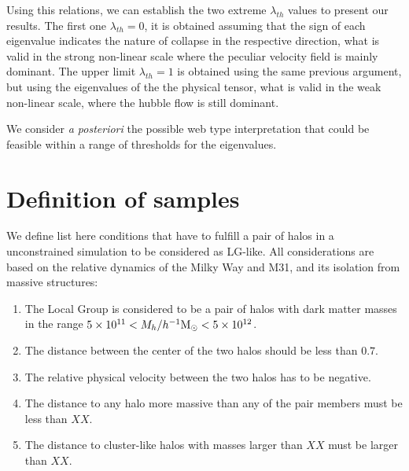 \documentclass[usenatbib]{mn2e}
\begin{document}
Using this relations, we can establish the two extreme $\lambda_{th}$ 
values to present our results. The first one $\lambda_{th} = 0$, it is 
obtained assuming that the sign of each eigenvalue indicates the nature of
collapse in the respective direction, what is valid in the strong 
non-linear scale where the peculiar velocity field is mainly dominant. 
The upper limit $\lambda_{th} = 1$ is obtained using the same previous 
argument, but using the eigenvalues of the the physical tensor, what is 
valid in the weak non-linear scale, where the hubble flow is still 
dominant.


We consider \textit{a posteriori} the possible web type interpretation 
that could be feasible within a range of thresholds for the eigenvalues. 


\section{Definition of samples}
\label{section:Def_Samples}


We define list here conditions that have to fulfill a pair of halos in a 
unconstrained simulation to be considered as LG-like. All considerations 
are based on the relative dynamics of the Milky Way and M31, and its 
isolation from massive structures:


\begin{enumerate}
\item{The Local Group is considered to be a pair of halos with dark matter 
masses in the range $5\times10^{11}<M_{h}/\hMsun < 5\times 10^{12}$.}

\item{The distance between the center of the two halos should be less than 
$0.7$\hMpc.}

\item{The relative physical velocity between the two halos has to be 
negative.}

\item{The distance to any halo more massive than any of the pair members 
must be less than $XX$\hMpc.}

\item{The distance to cluster-like halos with masses larger than $XX$\hMpc 
must be larger than $XX$\hMpc.}
\end{enumerate}
\end{document}
